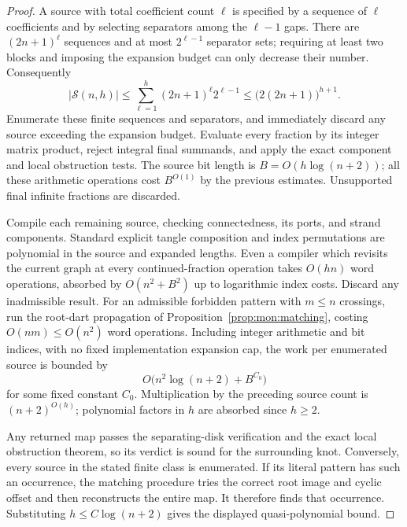 \begin{proof}
A source with total coefficient count $\ell$ is specified by a sequence of
$\ell$ coefficients and by selecting separators among the $\ell-1$ gaps.
There are $(2n+1)^\ell$ sequences and at most $2^{\ell-1}$ separator sets;
requiring at least two blocks and imposing the expansion budget can only
decrease their number.  Consequently
\[
 |\mathcal S(n,h)|
 \le \sum_{\ell=1}^{h}(2n+1)^\ell 2^{\ell-1}
 \le \bigl(2(2n+1)\bigr)^{h+1}.
\]
Enumerate these finite sequences and separators, and immediately discard any
source exceeding the expansion budget.  Evaluate every fraction by its
integer matrix product, reject integral final summands, and apply the exact
component and local obstruction tests.  The source bit length is
$B=O(h\log(n+2))$; all these arithmetic operations cost $B^{O(1)}$ by the
previous estimates.  Unsupported final infinite fractions are discarded.

Compile each remaining source, checking connectedness, its ports, and strand
components.  Standard explicit tangle composition and index permutations
are polynomial in the source and expanded lengths.  Even a compiler which
revisits the current graph at every continued-fraction operation takes
$O(hn)$ word operations, absorbed by
$O(n^2+B^2)$ up to logarithmic index costs.  Discard any inadmissible result.
For an admissible forbidden pattern with $m\le n$ crossings, run the
root-dart propagation of Proposition~\ref{prop:mon:matching}, costing
$O(nm)\le O(n^2)$ word operations.  Including integer arithmetic and bit
indices, with no fixed implementation expansion cap, the work per enumerated source is bounded by
\[
 O\bigl(n^2\log(n+2)+B^{C_0}\bigr)
\]
for some fixed constant $C_0$.  Multiplication by the preceding source count
is $(n+2)^{O(h)}$; polynomial factors in $h$ are absorbed since $h\ge2$.

Any returned map passes the separating-disk verification and the exact local
obstruction theorem, so its verdict is sound for the surrounding knot.
Conversely, every source in the stated finite class is enumerated.  If its
literal pattern has such an occurrence, the matching procedure tries the
correct root image and cyclic offset and then reconstructs the entire map.
It therefore finds that occurrence.  Substituting
$h\le C\log(n+2)$ gives the displayed quasi-polynomial bound.
\end{proof}

